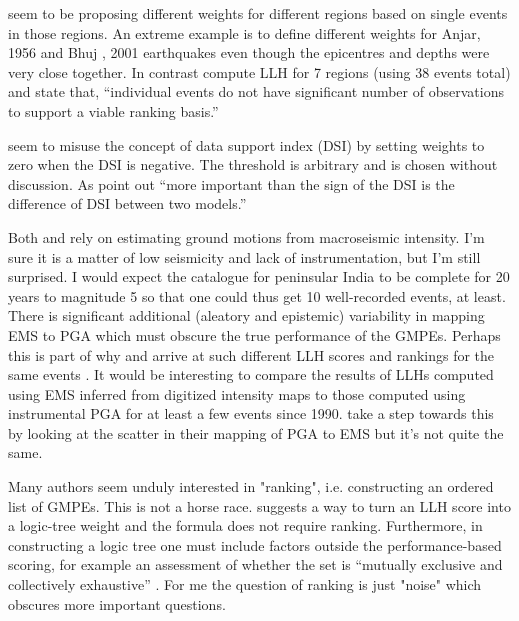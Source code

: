 \documentclass{article}
\begin{document}
\cite{anbazhagan2015selection} seem to be proposing different weights for different regions based on single events in those regions. An extreme example is to define different weights for Anjar, 1956 and Bhuj , 2001 earthquakes even though the epicentres and depths were very close together. In contrast \cite{nath2011peak} compute LLH for 7 regions (using 38 events total) and state that, ``individual events do not have significant number of observations to support a viable ranking basis.''

\cite{anbazhagan2015selection} seem to misuse the concept of data support index (DSI) \citep{delavaud2012toward} by setting weights to zero when the DSI is negative. The threshold is arbitrary and is chosen without discussion. As \cite{delavaud2012toward} point out ``more important
than the sign of the DSI is the difference of DSI between
two models.''

Both \cite{anbazhagan2015selection} and \cite{nath2011peak} rely on estimating ground motions from macroseismic intensity. I'm sure it is a matter of low seismicity and lack of instrumentation, but I'm still surprised. I would expect the catalogue for peninsular India to be complete for 20 years to magnitude 5 so that one could thus get 10 well-recorded events, at least. There is significant additional (aleatory and epistemic) variability in mapping EMS to PGA which must obscure the true performance of the GMPEs.  Perhaps this is part of why  \cite{anbazhagan2015selection} and \cite{nath2011peak} arrive at such different LLH scores and rankings for the same events \cite[][Table 5]{anbazhagan2015selection}. It would be interesting to compare the results of LLHs computed using EMS inferred from digitized intensity maps to those computed using instrumental PGA for at least a few events since 1990. \cite{nath2011peak} take a step towards this by looking at the scatter in their mapping of PGA to EMS but it's not quite the same.

Many authors \citep{scherbaum2009model, nath2011peak, delavaud2012toward, anbazhagan2015selection} seem unduly interested in "ranking", i.e.  constructing an ordered list of GMPEs. This is not a horse race. \cite{scherbaum2009model} suggests a way to turn an LLH score into a logic-tree weight and the formula does not require ranking. Furthermore, in constructing a logic tree one must include factors outside the performance-based scoring, for example an assessment of whether the set is ``mutually exclusive and collectively exhaustive'' \citep{bommer2008use}. For me the question of ranking is just "noise" which obscures more important questions.
\end{document}
